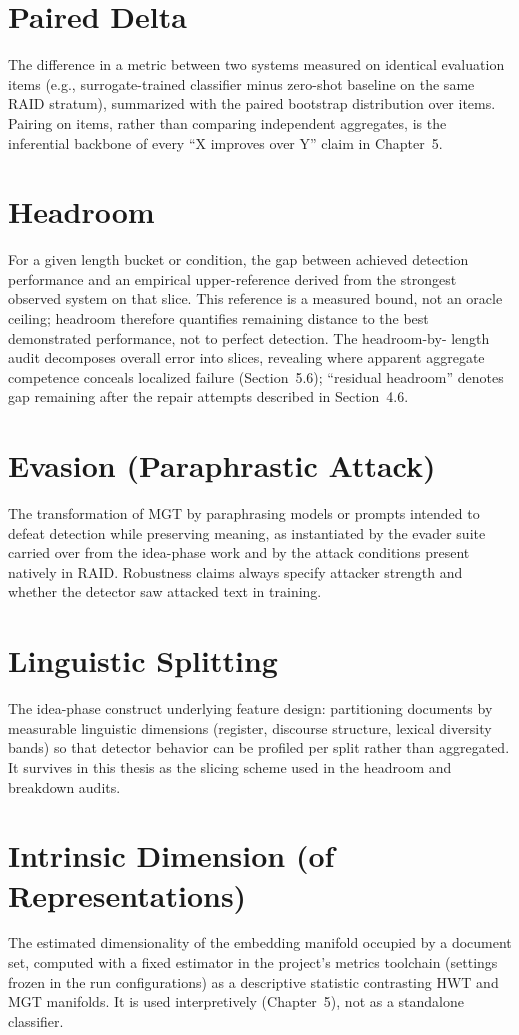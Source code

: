 \section{Paired Delta}
The difference in a metric between two systems measured on identical
evaluation items (e.g., surrogate-trained classifier minus zero-shot
baseline on the same RAID stratum), summarized with the paired bootstrap
distribution over items. Pairing on items, rather than comparing
independent aggregates, is the inferential backbone of every ``X improves
over Y'' claim in Chapter~5.

\section{Headroom}
For a given length bucket or condition, the gap between achieved detection
performance and an empirical upper-reference derived from the strongest
observed system on that slice. This reference is a measured bound, not an
oracle ceiling; headroom therefore quantifies remaining distance to the
best demonstrated performance, not to perfect detection. The headroom-by-
length audit decomposes overall error into slices, revealing where
apparent aggregate competence conceals localized failure (Section~5.6);
``residual headroom'' denotes gap remaining after the repair attempts
described in Section~4.6.

\section{Evasion (Paraphrastic Attack)}
The transformation of MGT by paraphrasing models or prompts intended to
defeat detection while preserving meaning, as instantiated by the evader
suite carried over from the idea-phase work and by the attack conditions
present natively in RAID. Robustness claims always specify attacker
strength and whether the detector saw attacked text in training.

\section{Linguistic Splitting}
The idea-phase construct underlying feature design: partitioning documents
by measurable linguistic dimensions (register, discourse structure,
lexical diversity bands) so that detector behavior can be profiled per
split rather than aggregated. It survives in this thesis as the slicing
scheme used in the headroom and breakdown audits.

\section{Intrinsic Dimension (of Representations)}
The estimated dimensionality of the embedding manifold occupied by a
document set, computed with a fixed estimator in the project's metrics
toolchain (settings frozen in the run configurations) as a descriptive
statistic contrasting HWT and MGT manifolds. It is used interpretively
(Chapter~5), not as a standalone classifier.

